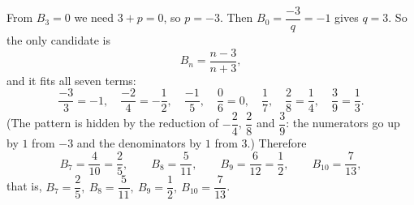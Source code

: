 From $B_3=0$ we need $3+p=0$, so $p=-3$. Then $B_0=\dfrac{-3}{q}=-1$ gives $q=3$. So the only candidate is
\[B_n=\dfrac{n-3}{n+3},\]
and it fits all seven terms:
\[\dfrac{-3}{3}=-1,\quad\dfrac{-2}{4}=-\dfrac12,\quad\dfrac{-1}{5},\quad\dfrac06=0,\quad\dfrac17,\quad\dfrac28=\dfrac14,\quad\dfrac39=\dfrac13.\]
(The pattern is hidden by the reduction of $-\dfrac24$, $\dfrac28$ and $\dfrac39$: the numerators go up by $1$ from $-3$ and the denominators by $1$ from $3$.) Therefore
\[B_7=\dfrac{4}{10}=\dfrac25,\qquad B_8=\dfrac{5}{11},\qquad B_9=\dfrac{6}{12}=\dfrac12,\qquad B_{10}=\dfrac{7}{13},\]
that is, $\boxed{B_7=\dfrac25,\ B_8=\dfrac5{11},\ B_9=\dfrac12,\ B_{10}=\dfrac7{13}}$.
